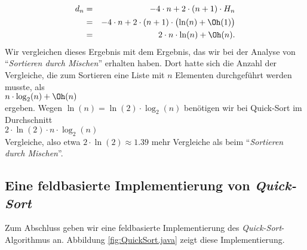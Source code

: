 \begin{eqnarray*}  
 d_n & = & -4 \cdot n + 2 \cdot(n+1) \cdot H_n \\
     & = & -4 \cdot n + 2 \cdot(n+1) \cdot \bigl(\ln(n) + \Oh(1)\bigr) \\
     & = & 2 \cdot n \cdot \ln(n) + \Oh(n).
\end{eqnarray*}
Wir vergleichen dieses Ergebnis mit dem Ergebnis, das wir bei der Analyse von
``\emph{Sortieren durch Mischen}'' erhalten haben.  Dort hatte sich die Anzahl
der Vergleiche, die zum Sortieren eine Liste mit $n$ Elementen durchgef\"uhrt
werden musste,
als \\[0.1cm]
\hspace*{1.3cm} $n \cdot \log_2(n) + \Oh(n)$ \\[0.1cm]
ergeben.  Wegen $\ln(n) = \ln(2) \cdot \log_2(n)$ ben\"otigen wir bei Quick-Sort im Durchschnitt \\[0.1cm]
\hspace*{1.3cm} $2 \cdot \ln(2) \cdot n \cdot \log_2(n)$ \\[0.1cm]
Vergleiche, also etwa $2 \cdot \ln(2) \approx 1.39$ mehr Vergleiche als beim
``\emph{Sortieren durch Mischen}''.

\subsection{Eine feldbasierte Implementierung von \emph{Quick-Sort}}
Zum Abschluss geben wir eine feldbasierte Implementierung des \emph{Quick-Sort}-Algorithmus
an.  Abbildung \ref{fig:QuickSort.java} zeigt diese Implementierung.

